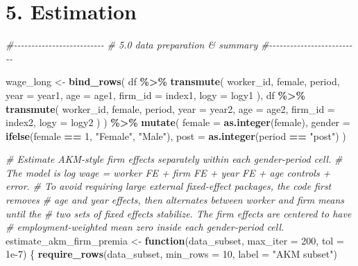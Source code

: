 \documentclass[
]{article}
\newenvironment{Shaded}{\begin{snugshade}}{\end{snugshade}}
\newcommand{\AttributeTok}[1]{\textcolor[rgb]{0.13,0.29,0.53}{#1}}
\newcommand{\CommentTok}[1]{\textcolor[rgb]{0.56,0.35,0.01}{\textit{#1}}}
\newcommand{\ControlFlowTok}[1]{\textcolor[rgb]{0.13,0.29,0.53}{\textbf{#1}}}
\newcommand{\DecValTok}[1]{\textcolor[rgb]{0.00,0.00,0.81}{#1}}
\newcommand{\FloatTok}[1]{\textcolor[rgb]{0.00,0.00,0.81}{#1}}
\newcommand{\FunctionTok}[1]{\textcolor[rgb]{0.13,0.29,0.53}{\textbf{#1}}}
\newcommand{\NormalTok}[1]{#1}
\newcommand{\OtherTok}[1]{\textcolor[rgb]{0.56,0.35,0.01}{#1}}
\newcommand{\SpecialCharTok}[1]{\textcolor[rgb]{0.81,0.36,0.00}{\textbf{#1}}}
\newcommand{\StringTok}[1]{\textcolor[rgb]{0.31,0.60,0.02}{#1}}
\begin{document}
\section{5. Estimation}\label{estimation}

\begin{Shaded}
\begin{Highlighting}[]
\CommentTok{\#{-}{-}{-}{-}{-}{-}{-}{-}{-}{-}{-}{-}{-}{-}{-}{-}{-}{-}{-}{-}{-}{-}{-}{-}{-}{-}}
\CommentTok{\# 5.0 data preparation \& summary}
\CommentTok{\#{-}{-}{-}{-}{-}{-}{-}{-}{-}{-}{-}{-}{-}{-}{-}{-}{-}{-}{-}{-}{-}{-}{-}{-}{-}{-}}

\NormalTok{wage\_long }\OtherTok{\textless{}{-}} \FunctionTok{bind\_rows}\NormalTok{(}
\NormalTok{    df }\SpecialCharTok{\%\textgreater{}\%}
        \FunctionTok{transmute}\NormalTok{(}
\NormalTok{            worker\_id,}
\NormalTok{            female,}
\NormalTok{            period,}
            \AttributeTok{year =}\NormalTok{ year1,}
            \AttributeTok{age =}\NormalTok{ age1,}
            \AttributeTok{firm\_id =}\NormalTok{ index1,}
            \AttributeTok{logy =}\NormalTok{ logy1}
\NormalTok{        ),}
\NormalTok{    df }\SpecialCharTok{\%\textgreater{}\%}
        \FunctionTok{transmute}\NormalTok{(}
\NormalTok{            worker\_id,}
\NormalTok{            female,}
\NormalTok{            period,}
            \AttributeTok{year =}\NormalTok{ year2,}
            \AttributeTok{age =}\NormalTok{ age2,}
            \AttributeTok{firm\_id =}\NormalTok{ index2,}
            \AttributeTok{logy =}\NormalTok{ logy2}
\NormalTok{        )}
\NormalTok{) }\SpecialCharTok{\%\textgreater{}\%}
    \FunctionTok{mutate}\NormalTok{(}
        \AttributeTok{female =} \FunctionTok{as.integer}\NormalTok{(female),}
        \AttributeTok{gender =} \FunctionTok{ifelse}\NormalTok{(female }\SpecialCharTok{==} \DecValTok{1}\NormalTok{, }\StringTok{"Female"}\NormalTok{, }\StringTok{"Male"}\NormalTok{),}
        \AttributeTok{post =} \FunctionTok{as.integer}\NormalTok{(period }\SpecialCharTok{==} \StringTok{"post"}\NormalTok{)}
\NormalTok{    )}

\CommentTok{\# Estimate AKM{-}style firm effects separately within each gender{-}period cell.}
\CommentTok{\# The model is log wage = worker FE + firm FE + year FE + age controls + error.}
\CommentTok{\# To avoid requiring large external fixed{-}effect packages, the code first removes}
\CommentTok{\# age and year effects, then alternates between worker and firm means until the}
\CommentTok{\# two sets of fixed effects stabilize. The firm effects are centered to have}
\CommentTok{\# employment{-}weighted mean zero inside each gender{-}period cell.}
\NormalTok{estimate\_akm\_firm\_premia }\OtherTok{\textless{}{-}} \ControlFlowTok{function}\NormalTok{(data\_subset, }\AttributeTok{max\_iter =} \DecValTok{200}\NormalTok{, }\AttributeTok{tol =} \FloatTok{1e{-}7}\NormalTok{) \{}
    \FunctionTok{require\_rows}\NormalTok{(data\_subset, }\AttributeTok{min\_rows =} \DecValTok{10}\NormalTok{, }\AttributeTok{label =} \StringTok{"AKM subset"}\NormalTok{)}


\end{Highlighting}
\end{Shaded}
\end{document}
